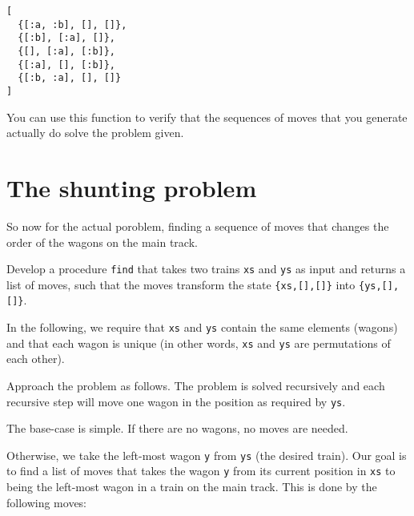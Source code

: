 \documentclass[a4paper,11pt]{article}
\begin{document}
\begin{verbatim}
[
  {[:a, :b], [], []},
  {[:b], [:a], []},
  {[], [:a], [:b]},
  {[:a], [], [:b]},
  {[:b, :a], [], []}
] 
\end{verbatim}

You can use this function to verify that the sequences of moves that
you generate actually do solve the problem given.

\section{The shunting problem}

So now for the actual poroblem, finding a sequence of moves that
changes the order of the wagons on the main track.

Develop a procedure \verb+find+ that takes two trains \verb+xs+
and \verb+ys+ as input and returns a list of moves, such that the
moves transform the state \verb+{xs,[],[]}+ into
\verb+{ys,[],[]}+.

In the following, we require that \verb+xs+ and \verb+ys+ contain the
same elements (wagons) and that each wagon is unique (in other
words, \verb+xs+ and \verb+ys+ are permutations of each other).

Approach the problem as follows. The problem is solved
recursively and each recursive step will move one wagon in the
position as required by \verb+ys+.

The base-case is simple. If there are no wagons, no moves are
needed.

Otherwise, we take the left-most wagon \verb+y+ from \verb+ys+ (the desired
train). Our goal is to find a list of moves that takes the wagon
\verb+y+ from its current position in \verb+xs+ to being the left-most
wagon in a train on the main track. This is done by the following
moves:

\end{document}
